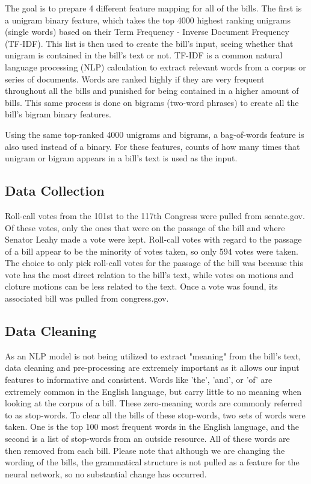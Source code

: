\documentclass[%
 reprint,
 amsmath,amssymb,
 aps,
]{revtex4-2}
\begin{document}
The goal is to prepare 4 different feature mapping for all of the bills. The first is a unigram binary feature, which takes the top 4000 highest ranking unigrams (single words) based on their Term Frequency - Inverse Document Frequency (TF-IDF). This list is then used to create the bill's input, seeing whether that unigram is contained in the bill's text or not. TF-IDF is a common natural language processing (NLP) calculation to extract relevant words from a corpus or series of documents. Words are ranked highly if they are very frequent throughout all the bills and punished for being contained in a higher amount of bills. This same process is done on bigrams (two-word phrases) to create all the bill's bigram binary features.

Using the same top-ranked 4000 unigrams and bigrams, a bag-of-words feature is also used instead of a binary. For these features, counts of how many times that unigram or bigram appears in a bill's text is used as the input.

\subsection{Data Collection}

Roll-call votes from the 101st to the 117th Congress were pulled from senate.gov\cite{senate}. Of these votes, only the ones that were on the passage of the bill and where Senator Leahy made a vote were kept. Roll-call votes with regard to the passage of a bill appear to be the minority of votes taken, so only 594 votes were taken. The choice to only pick roll-call votes for the passage of the bill was because this vote has the most direct relation to the bill's text, while votes on motions and cloture motions can be less related to the text. Once a vote was found, its associated bill was pulled from congress.gov\cite{congress}.

\subsection{Data Cleaning}

As an NLP model is not being utilized to extract "meaning" from the bill's text, data cleaning and pre-processing are extremely important as it allows our input features to informative and consistent. Words like 'the', 'and', or 'of' are extremely common in the English language, but carry little to no meaning when looking at the corpus of a bill. These zero-meaning words are commonly referred to as stop-words. To clear all the bills of these stop-words, two sets of words were taken. One is the top 100 most frequent words in the English language\cite{unigram}, and the second is a list of stop-words from an outside resource\cite{stop}. All of these words are then removed from each bill. Please note that although we are changing the wording of the bills, the grammatical structure is not pulled as a feature for the neural network, so no substantial change has occurred.
\end{document}
